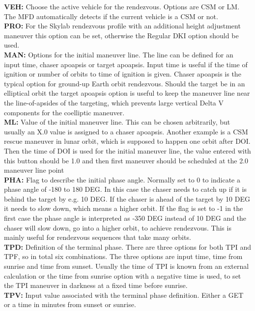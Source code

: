 \documentclass[11pt]{article} %
\begin{document}
\textbf{VEH:} Choose the active vehicle for the rendezvous. Options are CSM or LM. The MFD automatically detects if the current vehicle is a CSM or not.\\
\textbf{PRO:} For the Skylab rendezvous profile with an additional height adjustment maneuver this option can be set, otherwise the Regular DKI option should be used.\\
\textbf{MAN:} Options for the initial maneuver line. The line can be defined for an input time, chaser apoapsis or target apoapsis. Input time is useful if the time of ignition or number of orbits to time of ignition is given. Chaser apoapsis is the typical option for ground-up Earth orbit rendezvous. Should the target be in an elliptical orbit the target apoapsis option is useful to keep the maneuver line near the line-of-apsides of the targeting, which prevents large vertical Delta V components for the coelliptic maneuver.\\
\textbf{ML:} Value of the initial maneuver line. This can be chosen arbitrarily, but usually an X.0 value is assigned to a chaser apoapsis. Another example is a CSM rescue maneuver in lunar orbit, which is supposed to happen one orbit after DOI. Then the time of DOI is used for the initial maneuver line, the value entered with this button should be 1.0 and then first maneuver should be scheduled at the 2.0 maneuver line point\\
\textbf{PHA:} Flag to describe the initial phase angle. Normally set to 0 to indicate a phase angle of -180 to 180 DEG. In this case the chaser needs to catch up if it is behind the target by e.g. 10 DEG. If the chaser is ahead of the target by 10 DEG it needs to slow down, which means a higher orbit. If the flag is set to -1 in the first case the phase angle is interpreted as -350 DEG instead of 10 DEG and the chaser will slow down, go into a higher orbit, to achieve rendezvous. This is mainly useful for rendezvous sequences that take many orbits.\\

\textbf{TPD:} Definition of the terminal phase. There are three options for both TPI and TPF, so in total six combinations. The three options are input time, time from sunrise and time from sunset. Usually the time of TPI is known from an external calculation or the time from sunrise option with a negative time is used, to set the TPI maneuver in darkness at a fixed time before sunrise.\\
\textbf{TPV:} Input value associated with the terminal phase definition. Either a GET or a time in minutes from sunset or sunrise.\\
\end{document}
